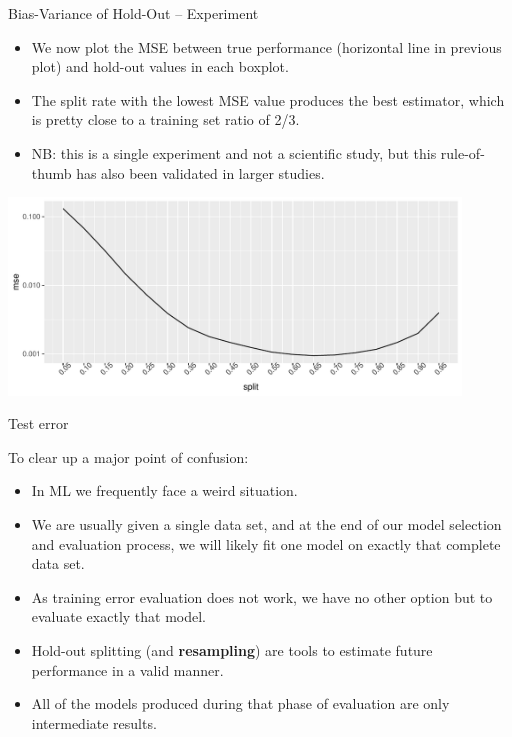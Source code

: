 \begin{vbframe}{Bias-Variance of Hold-Out -- Experiment}
\framebreak

\begin{itemize}
  \item We now plot the MSE between true performance (horizontal line in 
  previous plot) and hold-out values in each boxplot.
  \item The split rate with the lowest MSE value produces the best estimator, 
  which is pretty close to a training set ratio of 2/3.
  \item NB: this is a single experiment and not a scientific study, but this 
  rule-of-thumb has also been validated in larger studies.
\end{itemize}

\begin{center}
  \includegraphics[width=0.9\textwidth]{figure/test-holdout-example-2} 
\end{center}

\end{vbframe}


\begin{vbframe}{Test error}

To clear up a major point of confusion:
\medskip

\begin{itemize}
  \item In ML we frequently face a weird situation.
  \item We are usually given a single data set, and at the end of our model 
  selection and evaluation process, we will likely fit one model on exactly that 
  complete data set. 
  \item As training error evaluation does not work, we have no other option but 
  to evaluate exactly that model.
  \item Hold-out splitting (and \textbf{resampling}) are tools to estimate 
  future performance in a valid manner. 
  \item All of the models produced during that phase of evaluation are only
  intermediate results.
\end{itemize}

\end{vbframe}


\endlecture

